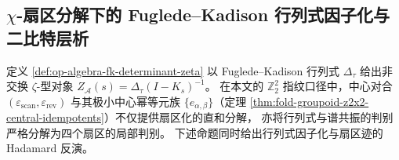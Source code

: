 \subsection{\texorpdfstring{$\chi$}{chi}-扇区分解下的 Fuglede--Kadison 行列式因子化与二比特层析}\label{subsec:op-algebra-chi-sector-fkdet-factorization}
定义 \ref{def:op-algebra-fk-determinant-zeta} 以 Fuglede--Kadison 行列式 \(\Delta_\tau\) 给出非交换 \(\zeta\)-型对象 \(Z_{\mathcal A}(s)=\Delta_\tau(I-K_s)^{-1}\)。
在本文的 \(\mathbb Z_2^2\) 指纹口径中，中心对合 \((\varepsilon_{\mathrm{scan}},\varepsilon_{\mathrm{rev}})\) 与其极小中心幂等元族 \(\{e_{\alpha,\beta}\}\)（定理 \ref{thm:fold-groupoid-z2x2-central-idempotents}）不仅提供扇区化的直和分解，
亦将行列式与谱共振的判别严格分解为四个扇区的局部判别。
下述命题同时给出行列式因子化与扇区迹的 Hadamard 反演。

